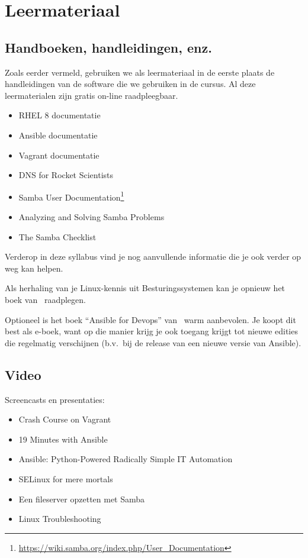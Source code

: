 \section{Leermateriaal}%
\label{sec:leermateriaal}

\subsection{Handboeken, handleidingen, enz.}%
\label{ssec:handboeken}

Zoals eerder vermeld, gebruiken we als leermateriaal in de eerste plaats de handleidingen van de software die we gebruiken in de cursus. Al deze leermaterialen zijn gratis on-line raadpleegbaar.

\begin{itemize}
  \item RHEL 8 documentatie
  \item Ansible documentatie~\autocite{Ansible2016}
  \item Vagrant documentatie~\autocite{Hashicorp}
  \item DNS for Rocket Scientists~\autocite{Aitchison2015}
  \item Samba User Documentation\footnote{\url{https://wiki.samba.org/index.php/User_Documentation}}
  \item Analyzing and Solving Samba Problems~\autocite{CarterEtAl2010}
  \item The Samba Checklist~\autocite{TrigdellEtAl2010}
\end{itemize}

Verderop in deze syllabus vind je nog aanvullende informatie die je ook verder op weg kan helpen.

Als herhaling van je Linux-kennis uit Besturingssystemen kan je opnieuw het boek van~\textcite{Cobbaut2015} raadplegen.

Optioneel is het boek ``Ansible for Devops'' van~\textcite{Geerling2016} warm aanbevolen. Je koopt dit best als e-boek, want op die manier krijg je ook toegang krijgt tot nieuwe edities die regelmatig verschijnen (b.v.~bij de release van een nieuwe versie van Ansible).

\subsection{Video}%
\label{ssec:video}

Screencasts en presentaties:

\begin{itemize}
  \item Crash Course on Vagrant~\autocite{Weissig2014}
  \item 19 Minutes with Ansible~\autocite{Weissig2015}
  \item Ansible: Python-Powered Radically Simple IT Automation~\autocite{DeHaan2014}
  \item SELinux for mere mortals~\autocite{Cameron2012}
  \item Een fileserver opzetten met Samba~\autocite{VanVreckem2014}
  \item Linux Troubleshooting~\autocite{VanVreckem2015b}
\end{itemize}

